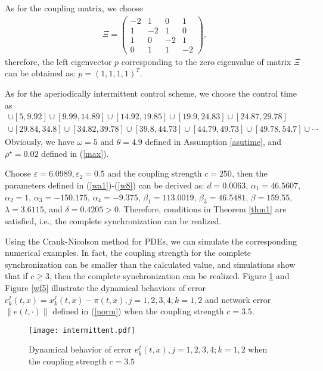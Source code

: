 \documentclass[review]{elsarticle}
\begin{document}
As for the coupling matrix, we choose
\begin{align*}
\Xi=\left(\begin{array}{cccc}-2&1&0&1\\1&-2&1&0\\1&0&-2&1\\0&1&1&-2\end{array}\right),
\end{align*}
therefore, the left eigenvector $p$ corresponding to the zero eigenvalue of matrix $\Xi$ can be obtained as:
$p=(1,1,1,1)^T$.

As for the aperiodically intermittent control scheme, we choose the control time as
\begin{align*}
[0,4.9]\cup [5,9.92]\cup [9.99,14.89]\cup [14.92,19.85]\cup [19.9,24.83]\cup [24.87,29.78]\\
\cup [29.84,34.8]\cup
[34.82,39.78]\cup [39.8,44.73]\cup [44.79,49.73]\cup [49.78,54.7]\cup \cdots
\end{align*}
Obviously, we have $\omega=5$ and $\theta=4.9$ defined in Assumption \ref{asutime}, and $\rho^{\star}=0.02$ defined in (\ref{max}).

Choose $\varepsilon=6.0989, \varepsilon_2=0.5$ and the coupling strength $c=250$, then the parameters defined in (\ref{wa1})-(\ref{w8}) can be derived as: $d=0.0063$, $\alpha_1=46.5607$, $\alpha_2=1$, $\alpha_3=-150.175$, $\alpha_4=-9.375$, $\beta_1=113.0019$, $\beta_3=46.5481$, $\beta=159.55$, $\lambda=3.6115$, and $\delta=0.4205>0$. Therefore, conditions in Theorem \ref{thm1} are satisfied, i.e., the complete synchronization can be realized.

Using the Crank-Nicolson method for PDEs, we can simulate the corresponding numerical examples. In fact, the coupling strength for the complete synchronization can be smaller than the calculated value, and simulations show that if $c\ge 3$, then the complete synchronization can be realized. Figure \ref{wf4} and Figure \ref{wf5} illustrate the dynamical behaviors of error $e^j_k(t,x)=x^j_k(t,x)-\pi(t,x), j=1,2,3,4; k=1,2$ and network error $\|e(t,\cdot)\|$ defined in (\ref{norm}) when the coupling strength $c=3.5$.

\begin{figure}
\begin{center}
\texttt{[image: intermittent.pdf]}
\end{center}
\caption{Dynamical behavior of error $e^j_k(t,x), j=1,2,3,4; k=1,2$ when the coupling strength $c=3.5$}\label{wf4}
\end{figure}
\end{document}
